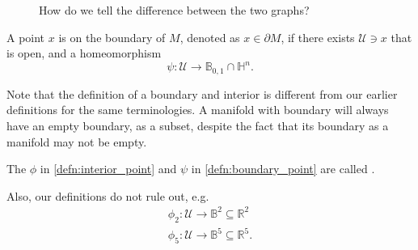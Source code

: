 \documentclass[notoc,notitlepage]{tufte-book}
\begin{document}
\begin{figure}[ht]
  \centering
  \caption{How do we tell the difference between the two graphs?}
  \label{fig:r_n_vs_h_n}
\end{figure}

\begin{defn}\label{defn:boundary_point}
  A point $x$ is on the boundary of $M$, denoted as $x \in \partial M$, if
  there exists $\mathcal{U} \ni x$ that is open, and a homeomorphism
  \begin{equation*}
    \psi : \mathcal{U} \to \mathbb{B}_{0, 1} \cap \mathbb{H}^n.
  \end{equation*}
\end{defn}

\begin{note}
  Note that the definition of a boundary and interior is different from our earlier
  definitions for the same terminologies. A manifold with boundary will always have
  an empty boundary, as a subset, despite the fact that its boundary as a manifold
  may not be empty.
\end{note}

\begin{note}
  The $\phi$ in \cref{defn:interior_point} and $\psi$ in \cref{defn:boundary_point}
  are called .

  Also, our definitions do not rule out, e.g.
  \begin{gather*}
    \phi_2 : \mathcal{U} \to \mathbb{B}^2 \subseteq \mathbb{R}^2 \\
    \phi_5 : \mathcal{U} \to \mathbb{B}^5 \subseteq \mathbb{R}^5.
  \end{gather*}
\end{note}
\end{document}
